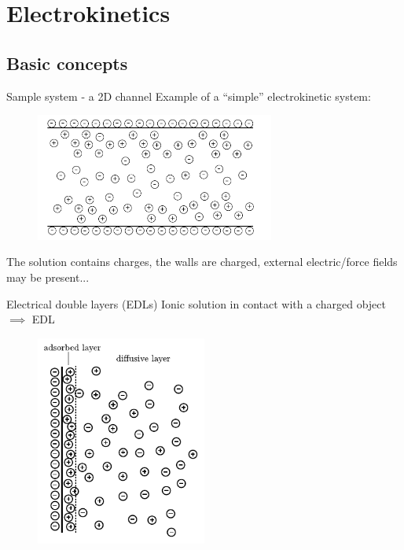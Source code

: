 \section{Electrokinetics}

\subsection{Basic concepts}

\begin{frame}{Sample system - a 2D channel}
Example of a ``simple'' electrokinetic system:

\begin{figure}
\begin{center}
\includegraphics[width=0.7\textwidth]{../fig/channel.pdf}
\end{center}
\end{figure}

The solution contains charges, the walls are charged, external
electric/force fields may be present...

\end{frame}

\begin{frame}{Electrical double layers (EDLs)}
Ionic solution in contact with a charged object $\implies$ EDL

\begin{figure}
\begin{center}
\includegraphics[width=0.5\textwidth]{../fig/edl.pdf}
\end{center}
\end{figure}

\end{frame}

